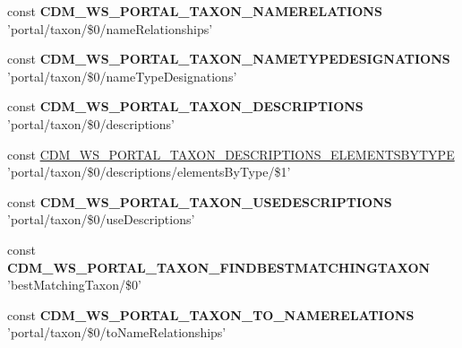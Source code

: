 \begin{DoxyCompactItemize}
\item 
\hypertarget{webservice__uris_8php_acd4ac1815c73e927cb071cc285af7726}{const {\bfseries C\-D\-M\-\_\-\-W\-S\-\_\-\-P\-O\-R\-T\-A\-L\-\_\-\-T\-A\-X\-O\-N\-\_\-\-N\-A\-M\-E\-R\-E\-L\-A\-T\-I\-O\-N\-S} 'portal/taxon/\$0/name\-Relationships'}\label{webservice__uris_8php_acd4ac1815c73e927cb071cc285af7726}

\item 
\hypertarget{webservice__uris_8php_a37084fba0d5673dd796eac26747b7d03}{const {\bfseries C\-D\-M\-\_\-\-W\-S\-\_\-\-P\-O\-R\-T\-A\-L\-\_\-\-T\-A\-X\-O\-N\-\_\-\-N\-A\-M\-E\-T\-Y\-P\-E\-D\-E\-S\-I\-G\-N\-A\-T\-I\-O\-N\-S} 'portal/taxon/\$0/name\-Type\-Designations'}\label{webservice__uris_8php_a37084fba0d5673dd796eac26747b7d03}

\item 
\hypertarget{webservice__uris_8php_a6aed35340ec6c8771114248f246ffd0c}{const {\bfseries C\-D\-M\-\_\-\-W\-S\-\_\-\-P\-O\-R\-T\-A\-L\-\_\-\-T\-A\-X\-O\-N\-\_\-\-D\-E\-S\-C\-R\-I\-P\-T\-I\-O\-N\-S} 'portal/taxon/\$0/descriptions'}\label{webservice__uris_8php_a6aed35340ec6c8771114248f246ffd0c}

\item 
const \hyperlink{webservice__uris_8php_a159d7ce2a69890c3c03ae938c2313247}{C\-D\-M\-\_\-\-W\-S\-\_\-\-P\-O\-R\-T\-A\-L\-\_\-\-T\-A\-X\-O\-N\-\_\-\-D\-E\-S\-C\-R\-I\-P\-T\-I\-O\-N\-S\-\_\-\-E\-L\-E\-M\-E\-N\-T\-S\-B\-Y\-T\-Y\-P\-E} 'portal/taxon/\$0/descriptions/elements\-By\-Type/\$1'
\item 
\hypertarget{webservice__uris_8php_aeeabb6482ec1f1dce9cc138ebae318e5}{const {\bfseries C\-D\-M\-\_\-\-W\-S\-\_\-\-P\-O\-R\-T\-A\-L\-\_\-\-T\-A\-X\-O\-N\-\_\-\-U\-S\-E\-D\-E\-S\-C\-R\-I\-P\-T\-I\-O\-N\-S} 'portal/taxon/\$0/use\-Descriptions'}\label{webservice__uris_8php_aeeabb6482ec1f1dce9cc138ebae318e5}

\item 
\hypertarget{webservice__uris_8php_ab1ea56f28168ec95f118c2649d196bda}{const {\bfseries C\-D\-M\-\_\-\-W\-S\-\_\-\-P\-O\-R\-T\-A\-L\-\_\-\-T\-A\-X\-O\-N\-\_\-\-F\-I\-N\-D\-B\-E\-S\-T\-M\-A\-T\-C\-H\-I\-N\-G\-T\-A\-X\-O\-N} 'best\-Matching\-Taxon/\$0'}\label{webservice__uris_8php_ab1ea56f28168ec95f118c2649d196bda}

\item 
\hypertarget{webservice__uris_8php_a28aa8f7bd668a72dc5db305115c99648}{const {\bfseries C\-D\-M\-\_\-\-W\-S\-\_\-\-P\-O\-R\-T\-A\-L\-\_\-\-T\-A\-X\-O\-N\-\_\-\-T\-O\-\_\-\-N\-A\-M\-E\-R\-E\-L\-A\-T\-I\-O\-N\-S} 'portal/taxon/\$0/to\-Name\-Relationships'}\label{webservice__uris_8php_a28aa8f7bd668a72dc5db305115c99648}


\end{DoxyCompactItemize}
